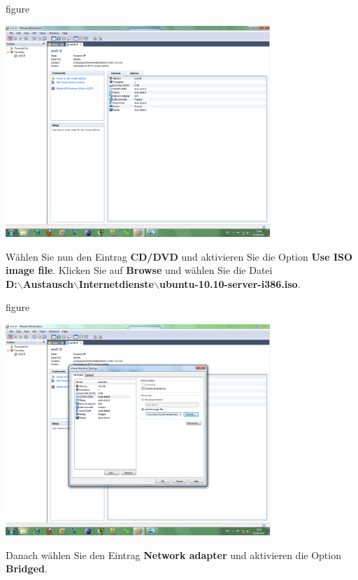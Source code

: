 \begin{nofloat}{figure}
\begin{center}
\includegraphics[width=0.75\textwidth]{screenshots/vm08.png}
\end{center}
\end{nofloat}

Wählen Sie nun den Eintrag \textbf{CD/DVD} und aktivieren Sie die Option \textbf{Use ISO image file}. Klicken Sie auf \textbf{Browse}
und wählen Sie die Datei \\ \textbf{D:$\backslash$Austausch$\backslash$Internetdienste$\backslash$ubuntu-10.10-server-i386.iso}.

\begin{nofloat}{figure}
\begin{center}
\includegraphics[width=0.75\textwidth]{screenshots/vm09.png}
\end{center}
\end{nofloat}

Danach wählen Sie den Eintrag \textbf{Network adapter} und aktivieren die Option
\textbf{Bridged}.

